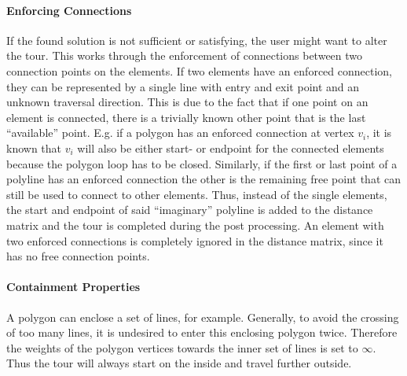 \paragraph{Enforcing Connections} If the found solution is not sufficient or satisfying, the user might want to alter the tour. This works through the enforcement of connections between two connection points on the elements. If two elements have an enforced connection, they can be represented by a single line with entry and exit point and an unknown traversal direction. This is due to the fact that if one point on an element is connected, there is a trivially known other point that is the last \enquote{available} point. E.g. if a polygon has an enforced connection at vertex $v_i$, it is known that $v_i$ will also be either start- or endpoint for the connected elements because the polygon loop has to be closed. Similarly, if the first or last point of a polyline has an enforced connection the other is the remaining free point that can still be used to connect to other elements. Thus, instead of the single elements, the start and endpoint of said \enquote{imaginary} polyline is added to the distance matrix and the tour is completed during the post processing. An element with two enforced connections is completely ignored in the distance matrix, since it has no free connection points.

\paragraph{Containment Properties}

A polygon can enclose a set of lines, for example. Generally, to avoid the crossing of too many lines, it is undesired to enter this enclosing polygon twice. Therefore the weights of the polygon vertices towards the inner set of lines is set to $\infty$. Thus the tour will always start on the inside and travel further outside.

